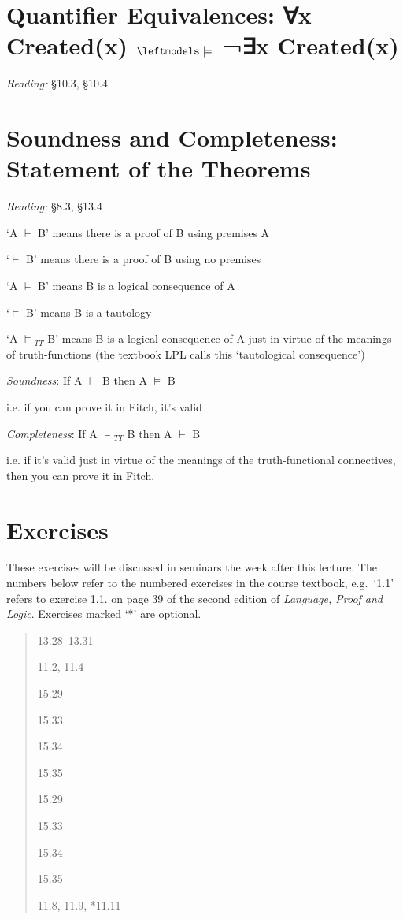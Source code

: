 \documentclass[12pt]{extarticle}
\begin{document}
\begin{multicols*}{3}
 
\section{Quantifier Equivalences: ∀x Created(x) $\leftmodels\models$ ¬∃x Created(x)}
 
\emph{Reading:} §10.3, §10.4
 
 
 
\section{Soundness and Completeness: Statement of the Theorems}
 
\emph{Reading:} §8.3, §13.4
 
‘A $\vdash$ B’ means there is a proof of B using premises A
 
‘$\vdash$ B’ means there is a proof of B using no premises
 
‘A $\models$ B’ means B is a logical consequence of A
 
‘$\models$ B’ means B is a tautology
 
‘A $\models$$_{TT}$ B’ means B is a logical consequence of A just in virtue of the meanings of truth-functions (the textbook LPL calls this ‘tautological consequence’)
 
\emph{Soundness}: If A $\vdash$ B then A $\models$ B
 
\hspace{3mm} i.e. if you can prove it in Fitch, it’s valid
 
\emph{Completeness}: If A $\models$$_{TT}$ B then A $\vdash$ B
 
\hspace{3mm} i.e. if it’s valid just in virtue of the meanings of the truth-functional connectives, then you can prove it in Fitch.
 
\vfill
\begin{minipage}{\columnwidth}
\section{Exercises}
These exercises will be discussed in seminars the week after this lecture.
The numbers below refer to the numbered exercises in the course textbook, e.g.\ `1.1' refers to exercise 1.1. on page 39 of the second edition of \emph{Language, Proof and Logic}. Exercises marked `*' are optional.
 
\begin{quote}
13.28--13.31
 
11.2, 11.4
 
15.29
 
15.33
 
15.34
 
15.35
 
15.29
 
15.33
 
15.34
 
15.35
 
11.8, 11.9, *11.11
 
\end{quote}
\end{minipage}


 

\end{multicols*}
\end{document}
